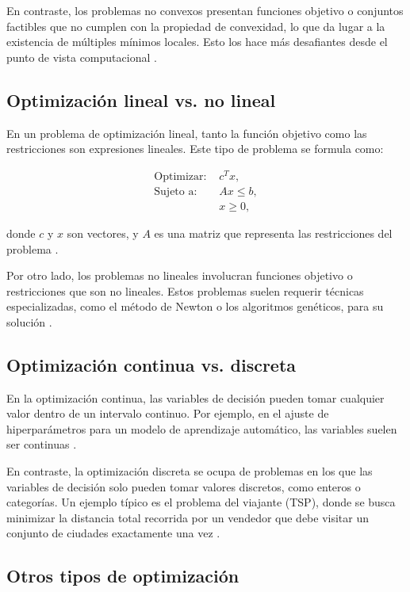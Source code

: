 En contraste, los problemas no convexos presentan funciones objetivo o conjuntos factibles que no cumplen con la propiedad de convexidad, lo que da lugar a la existencia de múltiples mínimos locales. Esto los hace más desafiantes desde el punto de vista computacional \cite{nocedal1999optimization}.

\subsection{Optimización lineal vs. no lineal}

En un problema de optimización lineal, tanto la función objetivo como las restricciones son expresiones lineales. Este tipo de problema se formula como:

\begin{align}
	\text{Optimizar: } & c^T x, \\
	\text{Sujeto a: } & Ax \leq b, \\
	& x \geq 0,
\end{align}

donde \(c\) y \(x\) son vectores, y \(A\) es una matriz que representa las restricciones del problema \cite{boyd2004convex}.

Por otro lado, los problemas no lineales involucran funciones objetivo o restricciones que son no lineales. Estos problemas suelen requerir técnicas especializadas, como el método de Newton o los algoritmos genéticos, para su solución \cite{goodfellow2016deep}.

\subsection{Optimización continua vs. discreta}

En la optimización continua, las variables de decisión pueden tomar cualquier valor dentro de un intervalo continuo. Por ejemplo, en el ajuste de hiperparámetros para un modelo de aprendizaje automático, las variables suelen ser continuas \cite{nocedal1999optimization}.

En contraste, la optimización discreta se ocupa de problemas en los que las variables de decisión solo pueden tomar valores discretos, como enteros o categorías. Un ejemplo típico es el problema del viajante (TSP), donde se busca minimizar la distancia total recorrida por un vendedor que debe visitar un conjunto de ciudades exactamente una vez \cite{papadimitriou1998combinatorial}.

\subsection{Otros tipos de optimización}

